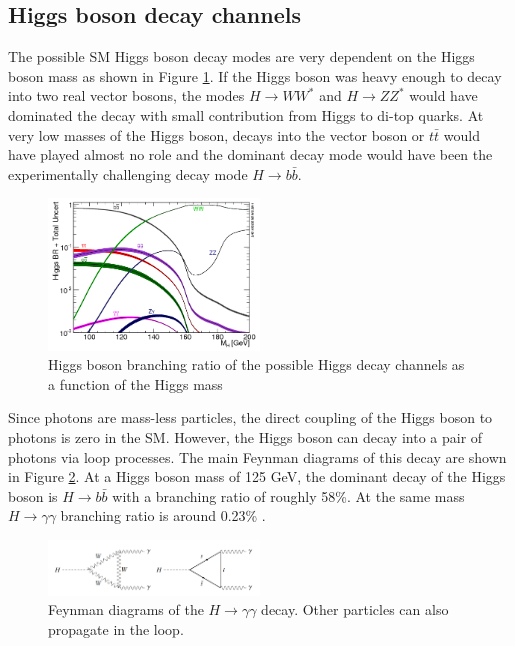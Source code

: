 \subsection{Higgs boson decay channels}
\label{chap1:EWSB:HD}
The possible SM Higgs boson decay modes are very dependent on the Higgs boson mass as shown in Figure \ref{fig:chap1:EWSB:BR}. If the Higgs boson was heavy enough to decay into two real vector bosons, the modes $H\rightarrow WW^*$ and $ H\rightarrow ZZ^*$ would have dominated the decay with small contribution from Higgs to di-top quarks. At very low masses of the Higgs boson, decays into the vector boson or $t\bar{t}$ would have played almost no role and the dominant decay mode would have been the experimentally challenging decay mode $H\rightarrow b\bar{b}$.
\begin{figure}[htbp]
    \centering
    \includegraphics[width=0.5\textwidth]{Ch1/Img/Higgs_Br.png}
    \caption{Higgs boson branching ratio of the possible Higgs decay channels as a function of the Higgs mass \cite{HiggsBR}}
    \label{fig:chap1:EWSB:BR}
\end{figure}
Since photons are mass-less particles, the direct coupling of the Higgs boson to photons is zero in the SM. However, the Higgs boson can decay into a pair of photons via loop processes. The main Feynman diagrams of this decay are shown in Figure \ref{fig:chap1:EWSB:Hgg}. 
At a Higgs boson mass of 125 GeV, the dominant decay of the Higgs boson is $H \rightarrow b\bar{b}$ with a branching ratio of roughly 58\%. At the same mass $H\rightarrow\gamma\gamma$ branching ratio is around 0.23\% \cite{HXSWG}.
\begin{figure}[htbp]
    \centering
    \includegraphics[width=0.5\textwidth]{Ch1/Img/H_to_gammagamma.png}
    \caption{Feynman diagrams of the $H\rightarrow\gamma\gamma$ decay. Other particles can also propagate in the loop.}
    \label{fig:chap1:EWSB:Hgg}
\end{figure}

